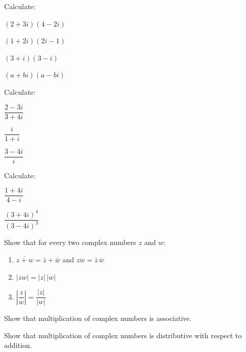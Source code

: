 \begin{exercise}
Calculate:
\begin{enumerate*}[label=\alph*), itemjoin={\qquad}]
\item $(2+3i)(4-2i)$
\item $(1+2i)(2i-1)$
\item $(3+i)(3-i)$
\item $(a+bi)(a-bi)$
\end{enumerate*}
\end{exercise}

\begin{exercise}
Calculate:
\begin{enumerate*}[label=\alph*), itemjoin={\qquad}]
\item $\dfrac{2-3i}{3+4i}$
\item $\dfrac{i}{1+i}$
\item $\dfrac{3-4i}{i}$
\end{enumerate*}
\end{exercise}

\begin{exercise}
Calculate:
\begin{enumerate*}[label=\alph*), itemjoin={\qquad}]
\item $\dfrac{1+4i}{4-i}$
\item $\dfrac{(3+4i)^4}{(3-4i)^3}$
\end{enumerate*}
\end{exercise}

\begin{exercise}
Show that for every two complex numbers $z$ and $w$:
\begin{enumerate}[label=\alph*)]
\item $\overline{z+w} = \bar z + \bar w$ and $\overline{zw} = \bar z\, \bar w$
\item $|zw| = |z|\,|w|$
\item $\left|\dfrac{z}{w}\right| = \dfrac{|z|}{|w|}$
\end{enumerate}
\end{exercise}

\begin{exercise}
Show that multiplication of complex numbers is associative.
\end{exercise}

\begin{exercise}
Show that multiplication of complex numbers is distributive with respect to addition.
\end{exercise}

